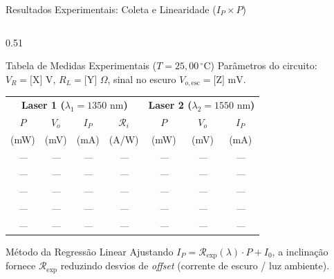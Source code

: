 \documentclass[aspectratio=169, 9pt]{beamer}
\begin{document}
\begin{frame}{Resultados Experimentais: Coleta e Linearidade ($I_P \times P$)}
  \begin{columns}[T, onlytextwidth]
    \begin{column}{0.51\textwidth}
      \begin{block}{Tabela de Medidas Experimentais ($T = 25{,}00\,^\circ\text{C}$)}
        \scriptsize
        Parâmetros do circuito: $V_R = \text{[X] V}$, $R_L = \text{[Y] }\Omega$, sinal no escuro $V_{o,\text{esc}} = \text{[Z] mV}$.
        \vspace{0.08cm}
        \begin{center}
          \begin{tabular}{cccc|ccc}
            \toprule
            \multicolumn{4}{c|}{\textbf{Laser 1 ($\lambda_1 = 1350\text{ nm}$)}} & \multicolumn{3}{c}{\textbf{Laser 2 ($\lambda_2 = 1550\text{ nm}$)}} \\
            $P$ & $V_o$ & $I_P$ & $\mathcal{R}_i$ & $P$ & $V_o$ & $I_P$ \\
            (mW) & (mV) & (mA) & (A/W) & (mW) & (mV) & (mA) \\
            \midrule
            \textit{---} & \textit{---} & \textit{---} & \textit{---} & \textit{---} & \textit{---} & \textit{---} \\
            \textit{---} & \textit{---} & \textit{---} & \textit{---} & \textit{---} & \textit{---} & \textit{---} \\
            \textit{---} & \textit{---} & \textit{---} & \textit{---} & \textit{---} & \textit{---} & \textit{---} \\
            \textit{---} & \textit{---} & \textit{---} & \textit{---} & \textit{---} & \textit{---} & \textit{---} \\
            \textit{---} & \textit{---} & \textit{---} & \textit{---} & \textit{---} & \textit{---} & \textit{---} \\
            \bottomrule
          \end{tabular}
        \end{center}
      \end{block}
      \vspace{-0.1cm}
      \begin{exampleblock}{Método da Regressão Linear}
        \scriptsize Ajustando $I_P = \mathcal{R}_{\text{exp}}(\lambda)\cdot P + I_0$, a inclinação fornece $\mathcal{R}_{\text{exp}}$ reduzindo desvios de \textit{offset} (corrente de escuro / luz ambiente).
      \end{exampleblock}
    \end{column}


\end{columns}
\end{frame}
\end{document}
